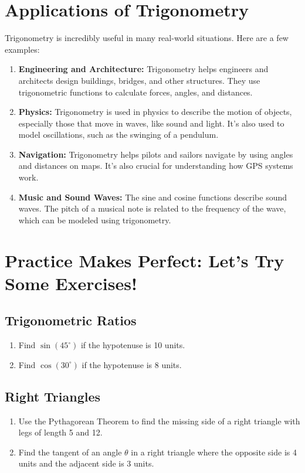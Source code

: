 \section{Applications of Trigonometry}
Trigonometry is incredibly useful in many real-world situations. Here are a few examples:
\begin{enumerate}
    \item \textbf{Engineering and Architecture:} Trigonometry helps engineers and architects design buildings, bridges, and other structures. They use trigonometric functions to calculate forces, angles, and distances.
    \item \textbf{Physics:} Trigonometry is used in physics to describe the motion of objects, especially those that move in waves, like sound and light. It’s also used to model oscillations, such as the swinging of a pendulum.
    \item \textbf{Navigation:} Trigonometry helps pilots and sailors navigate by using angles and distances on maps. It’s also crucial for understanding how GPS systems work.
    \item \textbf{Music and Sound Waves:} The sine and cosine functions describe sound waves. The pitch of a musical note is related to the frequency of the wave, which can be modeled using trigonometry.
\end{enumerate}

\section{Practice Makes Perfect: Let’s Try Some Exercises!}
\subsection{Trigonometric Ratios}
\begin{enumerate}
    \item Find $\sin(45^\circ)$ if the hypotenuse is 10 units.
    \item Find $\cos(30^\circ)$ if the hypotenuse is 8 units.
\end{enumerate}

\subsection{Right Triangles}
\begin{enumerate}
    \item Use the Pythagorean Theorem to find the missing side of a right triangle with legs of length 5 and 12.
    \item Find the tangent of an angle $\theta$ in a right triangle where the opposite side is 4 units and the adjacent side is 3 units.
\end{enumerate}

